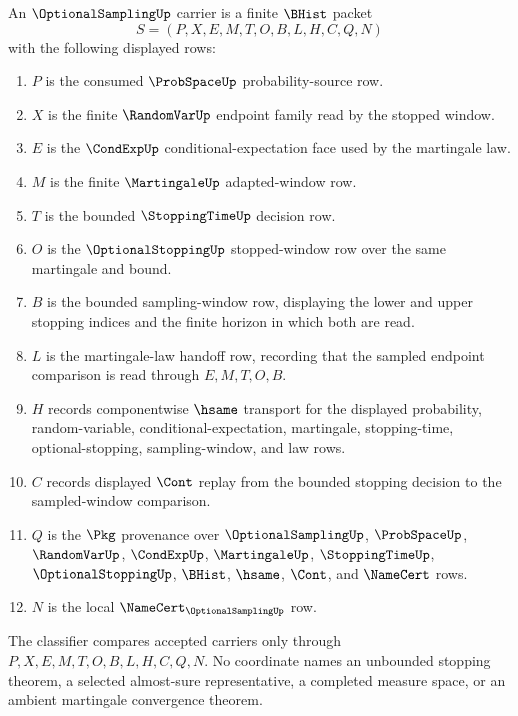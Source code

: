 \begin{definition}
\label{def:optional-sampling-carrier}
An $\OptionalSamplingUp$ carrier is a finite $\BHist$ packet
$$
S=(P,X,E,M,T,O,B,L,H,C,Q,N)
$$
with the following displayed rows:
\begin{enumerate}
\item $P$ is the consumed $\ProbSpaceUp$ probability-source row.
\item $X$ is the finite $\RandomVarUp$ endpoint family read by the stopped window.
\item $E$ is the $\CondExpUp$ conditional-expectation face used by the martingale law.
\item $M$ is the finite $\MartingaleUp$ adapted-window row.
\item $T$ is the bounded $\StoppingTimeUp$ decision row.
\item $O$ is the $\OptionalStoppingUp$ stopped-window row over the same martingale and bound.
\item $B$ is the bounded sampling-window row, displaying the lower and upper stopping indices and the finite horizon in which both are read.
\item $L$ is the martingale-law handoff row, recording that the sampled endpoint comparison is read through $E,M,T,O,B$.
\item $H$ records componentwise $\hsame$ transport for the displayed probability, random-variable, conditional-expectation, martingale, stopping-time, optional-stopping, sampling-window, and law rows.
\item $C$ records displayed $\Cont$ replay from the bounded stopping decision to the sampled-window comparison.
\item $Q$ is the $\Pkg$ provenance over $\OptionalSamplingUp$, $\ProbSpaceUp$, $\RandomVarUp$, $\CondExpUp$, $\MartingaleUp$, $\StoppingTimeUp$, $\OptionalStoppingUp$, $\BHist$, $\hsame$, $\Cont$, and $\NameCert$ rows.
\item $N$ is the local $\NameCert_{\OptionalSamplingUp}$ row.
\end{enumerate}
The classifier compares accepted carriers only through $P,X,E,M,T,O,B,L,H,C,Q,N$. No coordinate names an unbounded stopping theorem, a selected almost-sure representative, a completed measure space, or an ambient martingale convergence theorem.
\end{definition}

